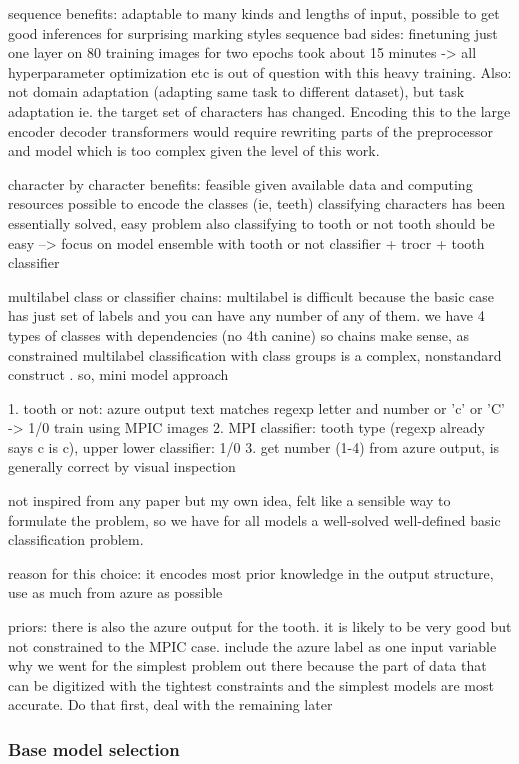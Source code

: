 \documentclass{article}
\begin{document}
sequence benefits: adaptable to many kinds and lengths of input, possible to get good inferences 
for surprising marking styles 
sequence bad sides: finetuning just one layer on 80 training images for two epochs took about 15 minutes
-> all hyperparameter optimization etc is out of question with this heavy training.
Also: not domain adaptation (adapting same task to different dataset), but task adaptation ie. 
the target set of characters has changed. Encoding this to the large encoder decoder transformers would 
require rewriting parts of the preprocessor and model which is too complex given the level of this work.

character by character benefits: feasible given available data and computing resources
possible to encode the classes (ie, teeth)
classifying characters has been essentially solved, easy problem 
also classifying to tooth or not tooth should be easy 
--> focus on model ensemble with tooth or not classifier + trocr + tooth classifier

multilabel class or classifier chains:
multilabel is difficult because the basic case has just set of labels and you can 
have any number of any of them. we have 4 types of classes with dependencies (no 4th canine)
so chains make sense, as constrained multilabel classification with class groups is a 
complex, nonstandard construct \cite{multilabel_classification}. so, mini model approach 

1. tooth or not: azure output text matches regexp letter and number or 'c' or 'C' -> 1/0 train using MPIC images
2. MPI classifier: tooth type (regexp already says c is c), upper lower classifier: 1/0
3. get number (1-4) from azure output, is generally correct by visual inspection

not inspired from any paper but my own idea, felt like a sensible way to formulate the problem, 
so we have for all models a well-solved well-defined basic classification problem.

reason for this choice: it encodes most prior knowledge in the output structure,
use as much from azure as possible

priors:
there is also the azure output for the tooth. it is likely to be very good but not constrained to the MPIC case.
include the azure label as one input variable
why we went for the simplest problem out there
because the part of data that can be digitized with the tightest constraints and the simplest models are most accurate. Do that first, deal with the remaining later
\subsubsection{Base model selection}
\end{document}
